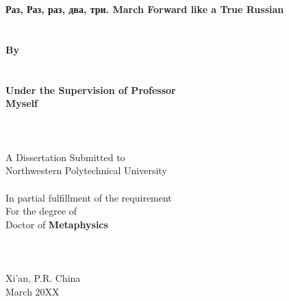 \begin{titlepage}
	\fTNR
	\begin{spacing}{1.2}
		\begin{center}
			\renewcommand{\baselinestretch}{1.2}
			\renewcommand{\captionfont}{\linespread{1.2}\normalsize}
			\setmainfont{\defaultEngFont}
			\sSanhao ~ \\
			\sSanhao ~ \\
			\fTNR \sErhao \textbf{Раз, Раз, раз, два, три. March Forward like a True Russian}
			\fSong \sXiaoer ~ \\
			\fSong \sXiaoer ~ \\
			\fSong \sXiaoer ~ \\
			\fTNR \sXiaosan \textbf{By}\\
			\fTNR \sXiaosan \textbf{\authornameInEnglish}\\
			\fSong \sXiaosan ~ \\
			\fTNR \sXiaosan \textbf{Under the Supervision of Professor}\\
			\fTNR \sXiaosan \textbf{Myself}
			\fSong \sSanhao ~ \\
			\fSong \sSanhao ~ \\
			\fSong \sSanhao ~ \\
			\fSong \sSanhao ~ \\
			\fTNR \sXiaosan A Dissertation Submitted to\\
			\fTNR \sXiaosan Northwestern Polytechnical University \\
			\fSong \sSanhao ~ \\
			\fTNR In partial fulfillment of the requirement \\
			\fTNR For the degree of \\
			\fTNR Doctor of \textbf{Metaphysics} %
			\fSong \sXiaosan ~ \\
			\fSong \sXiaosan ~ \\
			\fSong \sXiaosan ~ \\
			\fSong \sXiaosan ~ \\
			\fTNR \sXiaosan Xi'an, P.R. China \\
			\fTNR \sXiaosan March 20XX
		\end{center}
	\end{spacing}
\end{titlepage}

\fSong \normalsize

\endinput